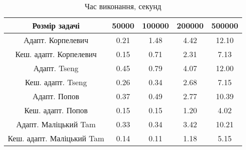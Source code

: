 \begin{table}[H]
	\centering
	\begin{tabular}{|c||c|c|c|c|}\hline
		Розмір задачі & 50000 & 100000 & 200000 & 500000 \\ \hline \hline
		Адапт. Корпелевич & 0.21 & 1.48 & 4.42 & 12.10 \\ \hline
		Кеш. адапт. Корпелевич & 0.15 & 0.71 & 2.31 & 7.13 \\ \hline
		Адапт. Tseng & 0.45 & 0.79 & 4.07 & 12.00 \\ \hline
		Кеш. адапт. Tseng & 0.26 & 0.34 & 2.68 & 7.15 \\ \hline
		Адапт. Попов & 0.37 & 0.49 & 2.77 & 10.39 \\ \hline
		Кеш. адапт. Попов & 0.15 & 0.15 & 1.20 & 4.02 \\ \hline
		Адапт. Маліцький Tam & 0.33 & 0.34 & 3.42 & 10.21 \\ \hline
		Кеш. адапт. Маліцький Tam & 0.14 & 0.11 & 1.18 & 5.15 \\ \hline
	\end{tabular}
	\caption{Час виконання, секунд}
\end{table}
